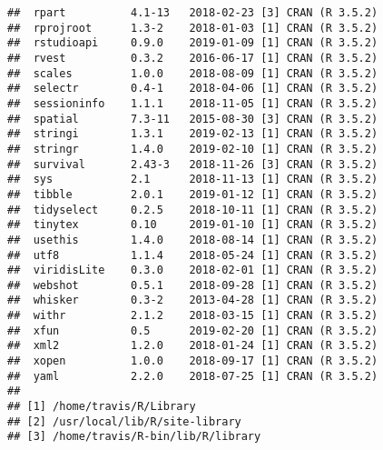 \documentclass[]{book}
\begin{document}
\begin{verbatim}
##  rpart          4.1-13   2018-02-23 [3] CRAN (R 3.5.2)
##  rprojroot      1.3-2    2018-01-03 [1] CRAN (R 3.5.2)
##  rstudioapi     0.9.0    2019-01-09 [1] CRAN (R 3.5.2)
##  rvest          0.3.2    2016-06-17 [1] CRAN (R 3.5.2)
##  scales         1.0.0    2018-08-09 [1] CRAN (R 3.5.2)
##  selectr        0.4-1    2018-04-06 [1] CRAN (R 3.5.2)
##  sessioninfo    1.1.1    2018-11-05 [1] CRAN (R 3.5.2)
##  spatial        7.3-11   2015-08-30 [3] CRAN (R 3.5.2)
##  stringi        1.3.1    2019-02-13 [1] CRAN (R 3.5.2)
##  stringr        1.4.0    2019-02-10 [1] CRAN (R 3.5.2)
##  survival       2.43-3   2018-11-26 [3] CRAN (R 3.5.2)
##  sys            2.1      2018-11-13 [1] CRAN (R 3.5.2)
##  tibble         2.0.1    2019-01-12 [1] CRAN (R 3.5.2)
##  tidyselect     0.2.5    2018-10-11 [1] CRAN (R 3.5.2)
##  tinytex        0.10     2019-01-10 [1] CRAN (R 3.5.2)
##  usethis        1.4.0    2018-08-14 [1] CRAN (R 3.5.2)
##  utf8           1.1.4    2018-05-24 [1] CRAN (R 3.5.2)
##  viridisLite    0.3.0    2018-02-01 [1] CRAN (R 3.5.2)
##  webshot        0.5.1    2018-09-28 [1] CRAN (R 3.5.2)
##  whisker        0.3-2    2013-04-28 [1] CRAN (R 3.5.2)
##  withr          2.1.2    2018-03-15 [1] CRAN (R 3.5.2)
##  xfun           0.5      2019-02-20 [1] CRAN (R 3.5.2)
##  xml2           1.2.0    2018-01-24 [1] CRAN (R 3.5.2)
##  xopen          1.0.0    2018-09-17 [1] CRAN (R 3.5.2)
##  yaml           2.2.0    2018-07-25 [1] CRAN (R 3.5.2)
## 
## [1] /home/travis/R/Library
## [2] /usr/local/lib/R/site-library
## [3] /home/travis/R-bin/lib/R/library
\end{verbatim}


\end{document}
